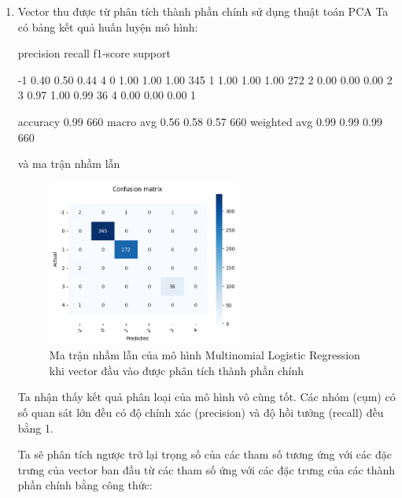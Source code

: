 \begin{enumerate}[label=(\alph*)]
    \item Vector thu được từ phân tích thành phần chính sử dụng thuật toán PCA 
    Ta có bảng kết quả huấn luyện mô hình:

    \begin{python}
        precision    recall  f1-score   support

        -1       0.40      0.50      0.44         4
         0       1.00      1.00      1.00       345
         1       1.00      1.00      1.00       272
         2       0.00      0.00      0.00         2
         3       0.97      1.00      0.99        36
         4       0.00      0.00      0.00         1

  accuracy                           0.99       660
 macro avg       0.56      0.58      0.57       660
weighted avg       0.99      0.99      0.99       660

    \end{python}

    và ma trận nhầm lẫn

    \begin{figure}[H]
        \centering
        \includegraphics[width=0.6\textwidth]{figures/Thanh/Data_Analysis/Non_null_confusion_matrix_Logistic_PCA_features.png}
        \caption{Ma trận nhầm lẫn của mô hình Multinomial Logistic Regression khi vector đầu vào được phân tích thành phần chính}
        \label{fig:Non_null_confusion_matrix_Logistic_PCA_features}
    \end{figure}

    Ta nhận thấy kết quả phân loại của mô hình vô cùng tốt.
    Các nhóm (cụm) có số quan sát lớn đều có độ chính xác (precision) và độ hồi tưởng (recall) đều bằng 1.

    Ta sẽ phân tích ngược trở lại trọng số của các tham số tương ứng với các đặc trưng của vector ban đầu từ các tham số ứng với các đặc trưng của các thành phần chính bằng công thức:


\end{enumerate}
